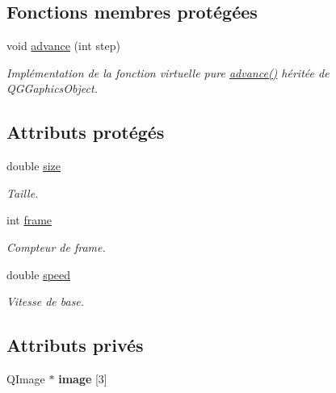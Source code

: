 \subsection*{Fonctions membres protégées}
\begin{DoxyCompactItemize}
\item 
void \hyperlink{classBug_a8e0ea03e85c9324a13328da60e5c52ee}{advance} (int step)
\begin{DoxyCompactList}\small\item\em Implémentation de la fonction virtuelle pure \hyperlink{classBug_a8e0ea03e85c9324a13328da60e5c52ee}{advance()} héritée de QGGaphicsObject. \end{DoxyCompactList}\end{DoxyCompactItemize}
\subsection*{Attributs protégés}
\begin{DoxyCompactItemize}
\item 
double \hyperlink{classBug_a27a0f0b84d15525e409955509e6e3c42}{size}
\begin{DoxyCompactList}\small\item\em Taille. \end{DoxyCompactList}\item 
int \hyperlink{classBug_ad7e3597cf049f1051be94fcaf2fd3598}{frame}
\begin{DoxyCompactList}\small\item\em Compteur de frame. \end{DoxyCompactList}\item 
double \hyperlink{classBug_a13b95fbf23748ea853b01bfd0b0e7fc8}{speed}
\begin{DoxyCompactList}\small\item\em Vitesse de base. \end{DoxyCompactList}\end{DoxyCompactItemize}
\subsection*{Attributs privés}
\begin{DoxyCompactItemize}
\item 
\hypertarget{classRoach_afe6b72503197eb2bacafda9df317b96f}{
QImage $\ast$ {\bfseries image} \mbox{[}3\mbox{]}}
\label{classRoach_afe6b72503197eb2bacafda9df317b96f}

\end{DoxyCompactItemize}


